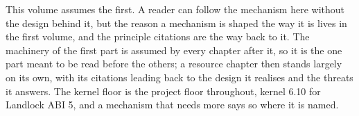 This volume assumes the first. A reader can follow the mechanism here
without the design behind it, but the reason a mechanism is shaped the
way it is lives in the first volume, and the principle citations are the
way back to it. The machinery of the first part is assumed by every
chapter after it, so it is the one part meant to be read before the
others; a resource chapter then stands largely on its own, with its
citations leading back to the design it realises and the threats it
answers. The kernel floor is the project floor throughout, kernel 6.10
for Landlock ABI 5, and a mechanism that needs more says so where it is
named.
